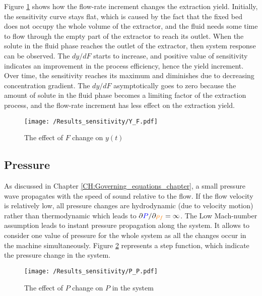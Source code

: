 \documentclass[../Article_Model_Parameters.tex]{subfiles}
\begin{document}
    Figure \ref{fig:Sensitivty_F_y} shows how the flow-rate increment changes the extraction yield. Initially, the sensitivity curve stays flat, which is caused by the fact that the fixed bed does not occupy the whole volume of the extractor, and the fluid needs some time to flow through the empty part of the extractor to reach its outlet. When the solute in the fluid phase reaches the outlet of the extractor, then system response can be observed. The $dy/dF$ starts to increase, and positive value of sensitivity indicates an improvement in the process efficiency, hence the yield increment. Over time, the sensitivity reaches its maximum and diminishes due to decreasing concentration gradient. The $dy/dF$ asymptotically goes to zero because the amount of solute in the fluid phase becomes a limiting factor of the extraction process, and the flow-rate increment has less effect on the extraction yield.
    
    \begin{figure}[h!]
    	\centering
    	\texttt{[image: /Results\_sensitivity/Y\_F.pdf]}
    	\caption{The effect of $F$ change on $y(t)$}
    	\label{fig:Sensitivty_F_y}
    \end{figure}
    
    \subsection{Pressure}
    
    As discussed in Chapter \ref{CH:Governing_equations_chapter}, a small pressure wave propagates with the speed of sound relative to the flow. If the flow velocity is relatively low, all pressure changes are hydrodynamic (due to velocity motion) rather than thermodynamic which leads to $\partial {\color{blue}P}/\partial {\color{orange}\rho_f} = \infty$. The Low Mach-number assumption leads to instant pressure propagation along the system. It allows to consider one value of pressure for the whole system as all the changes occur in the machine simultaneously. Figure \ref{fig:Sensitivty_P_P} represents a step function, which indicate the pressure change in the system. 
    
    \begin{figure}[h!]
    	\centering
    	\texttt{[image: /Results\_sensitivity/P\_P.pdf]}
    	\caption{The effect of $P$ change on $P$ in the system}
    	\label{fig:Sensitivty_P_P}
    \end{figure}
    
\end{document}
